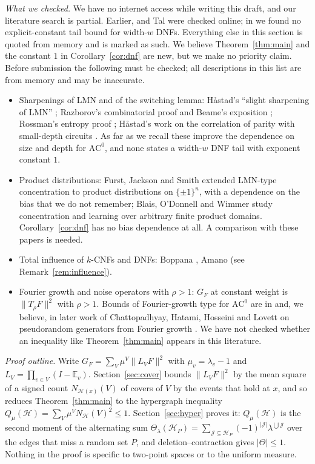 \documentclass[11pt,reqno]{amsart}
\theoremstyle{definition}
\newcommand{\E}{\mathbb E}
\newcommand{\Ho}{\mathcal H}
\newcommand{\cJ}{\mathcal J}
\begin{document}
\emph{What we checked.}  We have no internet access while writing this
draft, and our literature search is partial.  Earlier, \cite{LT} and Tal
\cite{Tal} were checked online; in \cite{Tal} we found no explicit-constant
tail bound for width-$w$ DNFs.  Everything else in this section is quoted
from memory and is marked as such.  We believe Theorem~\ref{thm:main} and the
constant $1$ in Corollary~\ref{cor:dnf} are new, but we make no priority
claim.  Before submission the following must be checked; all descriptions in
this list are from memory and may be inaccurate.
\begin{itemize}
\item Sharpenings of LMN and of the switching lemma: H{\aa}stad's ``slight
sharpening of LMN'' \cite{Hastad01}; Razborov's combinatorial proof and
Beame's exposition \cite{Beame}; Rossman's entropy proof \cite{Rossman};
H{\aa}stad's work on the correlation of parity with small-depth circuits
\cite{Hastad14}.  As far as we recall these improve the dependence on size
and depth for $\mathrm{AC}^0$, and none states a width-$w$ DNF tail with
exponent constant $1$.
\item Product distributions: Furst, Jackson and Smith \cite{FJS} extended
LMN-type concentration to product distributions on $\{\pm1\}^n$, with a
dependence on the bias that we do not remember; Blais, O'Donnell and Wimmer
\cite{BOW} study concentration and learning over arbitrary finite product
domains.  Corollary~\ref{cor:dnf} has no bias dependence at all.  A
comparison with these papers is needed.
\item Total influence of $k$-CNFs and DNFs: Boppana \cite{Boppana}, Amano
\cite{Amano} (see Remark~\ref{rem:influence}).
\item Fourier growth and noise operators with $\rho>1$: $G_F$ at constant weight
is $\|T_\rho F\|^2$ with $\rho>1$.  Bounds of Fourier-growth type for $\mathrm{AC}^0$
are in \cite{Tal} and, we believe, in later work of Chattopadhyay, Hatami,
Hosseini and Lovett on pseudorandom generators from Fourier growth
\cite{CHHL}.  We have not checked whether an inequality like
Theorem~\ref{thm:main} appears in this literature.
\end{itemize}

\emph{Proof outline.}  Write $G_F=\sum_V\mu^V\|L_VF\|^2$ with $\mu_v=\lambda_v-1$ and
$L_V=\prod_{v\in V}(I-\E_v)$.  Section~\ref{sec:cover} bounds $\|L_VF\|^2$ by the
mean square of a signed count $N_{\Ho(x)}(V)$ of covers of $V$ by the events
that hold at $x$, and so reduces Theorem~\ref{thm:main} to the hypergraph
inequality $Q_\mu(\Ho)=\sum_V\mu^VN_\Ho(V)^2\le1$.  Section~\ref{sec:hyper} proves
it: $Q_\mu(\Ho)$ is the second moment of the alternating sum
$\Theta_\lambda(\Ho_P)=\sum_{\cJ\subseteq\Ho_P}(-1)^{|\cJ|}\lambda^{\bigcup\cJ}$ over the edges that
miss a random set $P$, and deletion--contraction gives $|\Theta|\le1$.  Nothing
in the proof is specific to two-point spaces or to the uniform measure.
\end{document}
